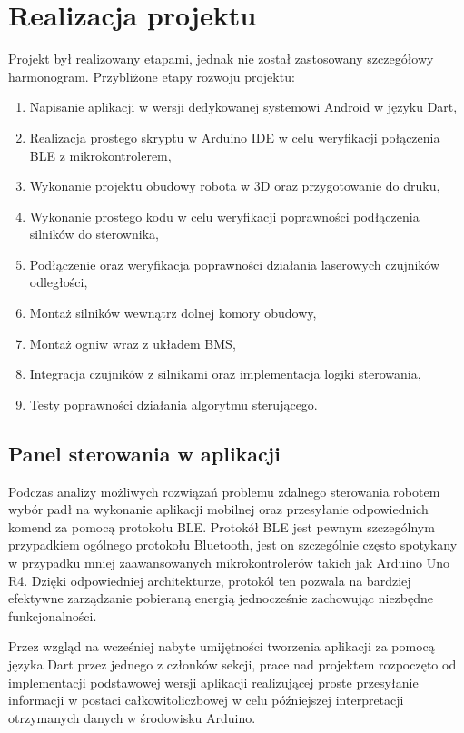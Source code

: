 \documentclass{report}
\begin{document}
\section{\LARGE Realizacja projektu}
Projekt był realizowany etapami, jednak nie został zastosowany szczegółowy harmonogram. 
Przybliżone etapy rozwoju projektu:
\begin{enumerate}
    \item Napisanie aplikacji w wersji dedykowanej systemowi Android w języku Dart,
    \item Realizacja prostego skryptu w Arduino IDE w celu weryfikacji połączenia BLE z mikrokontrolerem,
    \item Wykonanie projektu obudowy robota w 3D oraz przygotowanie do druku,
    \item Wykonanie prostego kodu w celu weryfikacji poprawności podłączenia silników do sterownika,
    \item Podłączenie oraz weryfikacja poprawności działania laserowych czujników odległości,
    \item Montaż silników wewnątrz dolnej komory obudowy,
    \item Montaż ogniw wraz z układem BMS,
    \item Integracja czujników z silnikami oraz implementacja logiki sterowania,
    \item Testy poprawności działania algorytmu sterującego.
\end{enumerate}

\subsection{\Large Panel sterowania w aplikacji}
Podczas analizy możliwych rozwiązań problemu zdalnego sterowania robotem wybór padł na wykonanie aplikacji mobilnej oraz przesyłanie odpowiednich komend za pomocą protokołu BLE. Protokół BLE jest pewnym szczególnym przypadkiem ogólnego protokołu Bluetooth, jest on szczególnie często spotykany w przypadku mniej zaawansowanych mikrokontrolerów takich jak Arduino Uno R4. Dzięki odpowiedniej architekturze, protokól ten pozwala na bardziej efektywne zarządzanie pobieraną energią jednocześnie zachowując niezbędne funkcjonalności. 

Przez wzgląd na wcześniej nabyte umijętności tworzenia aplikacji za pomocą języka Dart przez jednego z członków sekcji, prace nad projektem rozpoczęto od implementacji podstawowej wersji aplikacji realizującej proste przesyłanie informacji w postaci całkowitoliczbowej w celu późniejszej interpretacji otrzymanych danych w środowisku Arduino. 
\end{document}
